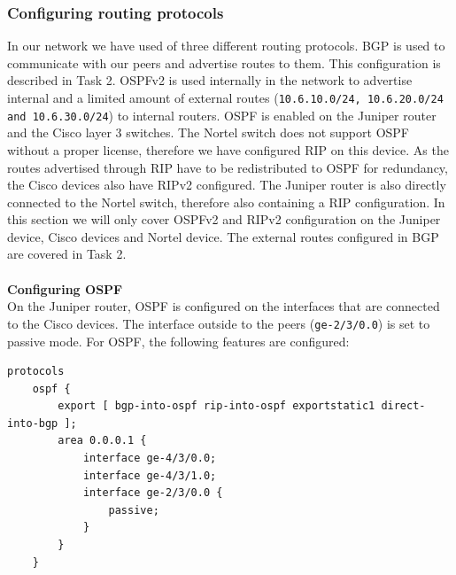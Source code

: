 \documentclass[10pt,a4paper]{article}
\begin{document}
\subsubsection{Configuring routing protocols}
In our network we have used of three different routing protocols. BGP is used to communicate with our peers and advertise routes to them. This configuration is described in Task 2. OSPFv2 is used internally in the network to advertise internal and a limited amount of external routes (\texttt{10.6.10.0/24, 10.6.20.0/24 and 10.6.30.0/24}) to internal routers. OSPF is enabled on the Juniper router and the Cisco layer 3 switches. The Nortel switch does not support OSPF without a proper license, therefore we have configured RIP on this device. As the routes advertised through RIP have to be redistributed to OSPF for redundancy, the Cisco devices also have RIPv2 configured. The Juniper router is also directly connected to the Nortel switch, therefore also containing a RIP configuration. In this section we will only cover OSPFv2 and RIPv2 configuration on the Juniper device, Cisco devices and Nortel device. The external routes configured in BGP are covered in Task 2.\\
\\
\textbf{Configuring OSPF}\\
On the Juniper router, OSPF is configured on the interfaces that are connected to the Cisco devices. The interface outside to the peers (\texttt{ge-2/3/0.0}) is set to passive mode. For OSPF, the following features are configured:
\begin{verbatim}
protocols
    ospf {
        export [ bgp-into-ospf rip-into-ospf exportstatic1 direct-into-bgp ];
        area 0.0.0.1 {
            interface ge-4/3/0.0;
            interface ge-4/3/1.0;
            interface ge-2/3/0.0 {
                passive;
            }
        }
    }
\end{verbatim}
\end{document}
